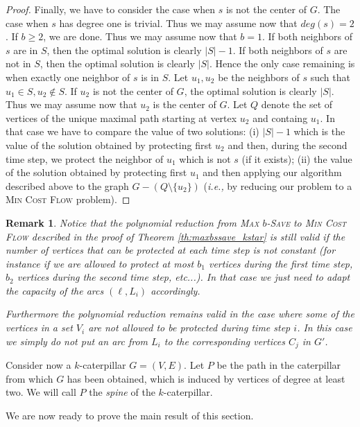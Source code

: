 \documentclass[10pt]{article}
\newcommand{\probtitle}[1]{\textsc{#1}}
\newcommand{\qedfill}[0]{ }
\newtheorem{remark}{Remark}
\begin{document}
\begin{proof}
Finally, we have to consider the case when $s$ is not the center of $G$. The case when $s$ has degree one is trivial. Thus we may assume now that $deg(s)=2$. If $b\geq 2$, we are done. Thus we may assume now that $b=1$. If both neighbors of $s$ are in $S$, then the optimal solution is clearly $|S|-1$. If both neighbors of $s$ are not in $S$, then the optimal solution is clearly $|S|$. Hence the only case remaining is when exactly one neighbor of $s$ is in $S$. Let $u_1,u_2$ be the neighbors of $s$ such that $u_1\in S,u_2\not\in S$. If $u_2$ is not the center of $G$, the optimal solution is clearly $|S|$. Thus we may assume now that $u_2$ is the center of $G$. Let $Q$ denote the set of vertices of the unique maximal path starting at vertex $u_2$ and containg $u_1$. In that case we have to compare the value of two solutions: (i) $|S|-1$ which is the value of the solution obtained by protecting first $u_2$ and then, during the second time step, we protect the neighbor of $u_1$ which is not $s$ (if it exists); (ii) the value of the solution obtained by protecting first $u_1$ and then applying our algorithm described above to the graph $G-(Q\setminus \{u_2\})$ (\textit{i.e.,} by reducing our problem to a \probtitle{Min Cost Flow} problem).\qedfill
\end{proof}

\begin{remark}
\label{kstar_general}
Notice that the polynomial reduction from \probtitle{Max $b$-Save} to \probtitle{Min Cost Flow} described in the proof of Theorem \ref{th:maxbssave_kstar} is still valid if the number of vertices that can be protected at each time step is not constant (for instance if we are allowed to protect at most $b_1$ vertices during the first time step, $b_2$ vertices during the second time step, etc...). In that case we just need to adapt the capacity of the arcs $(\ell,L_i)$ accordingly.

Furthermore the polynomial reduction remains valid in the case where some of the vertices in a set $V_i$ are not allowed to be protected during time step $i$. In this case we simply do not put an arc from $L_i$ to the corresponding vertices $C_j$ in $G'$.
\end{remark}

Consider now a $k$-caterpillar $G=(V,E)$. Let $P$ be the path in the caterpillar from which $G$ has been obtained, which is induced by vertices of degree at least two. We will call $P$ the \textit{spine} of the $k$-caterpillar.

We are now ready to prove the main result of this section.
\end{document}
